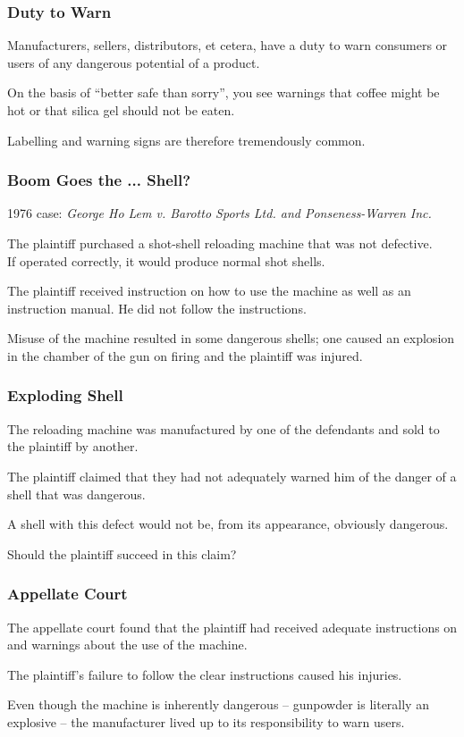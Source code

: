 \begin{frame}
\frametitle{Duty to Warn}

Manufacturers, sellers, distributors, et cetera, have a duty to warn consumers or users of any dangerous potential of a product.

On the basis of ``better safe than sorry'', you see warnings that coffee might be hot or that silica gel should not be eaten.

Labelling and warning signs are therefore tremendously common.

\end{frame}




\begin{frame}
\frametitle{Boom Goes the ... Shell?}

1976 case: \textit{George Ho Lem v. Barotto Sports Ltd. and Ponseness-Warren Inc.}~\cite{lpe}

The plaintiff purchased a shot-shell reloading machine that was not defective.\\
\quad If operated correctly, it would produce normal shot shells.

The plaintiff received instruction on how to use the machine as well as an instruction manual. He did not follow the instructions.

Misuse of the machine resulted in some dangerous shells; one caused an explosion in the chamber of the gun on firing and the plaintiff was injured.

\end{frame}



\begin{frame}
\frametitle{Exploding Shell}

The reloading machine was manufactured by one of the defendants and sold to the plaintiff by another.

The plaintiff claimed that they had not adequately warned him of the danger of a shell that was dangerous.

A shell with this defect would not be, from its appearance, obviously dangerous.

Should the plaintiff succeed in this claim?

\end{frame}



\begin{frame}
\frametitle{Appellate Court}

The appellate court found that the plaintiff had received adequate instructions on and warnings about the use of the machine.

The plaintiff's failure to follow the clear instructions caused his injuries.

Even though the machine is inherently dangerous -- gunpowder is literally an explosive -- the manufacturer lived up to its responsibility to warn users.

\end{frame}



